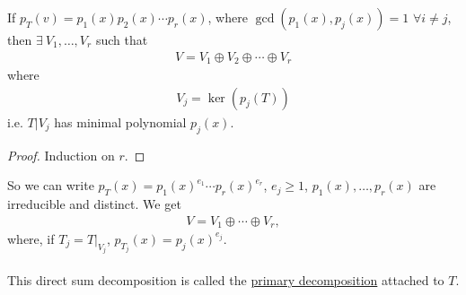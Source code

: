 \documentclass[class=scrartcl, crop=false]{standalone}
\begin{document}
\begin{theorem}
  If $p_T(v) = p_1(x)p_2(x)\cdots p_r(x)$, where $\gcd(p_1(x), p_j(x)) = 1$ $\forall i \neq j$, then $\exists \ V_1, \dots, V_r$ such that 
  \begin{gather*}
    V = V_1 \oplus V_2 \oplus \cdots \oplus V_r
  \end{gather*}  where
  \begin{gather*}
    V_j = \ker(p_j(T))
  \end{gather*} 
  i.e. $T | V_j$ has minimal polynomial $p_j(x)$.
  \begin{proof}
    Induction on $r$.
  \end{proof} 
\end{theorem} 
So we can write $p_T(x) = p_1(x)^{e_1} \cdots p_r(x)^{e_r}$, $e_j \geq 1$, $p_1(x), \dots, p_r(x)$ are irreducible and distinct. We get
\begin{gather*}
  V = V_1 \oplus \cdots \oplus V_r,
\end{gather*}
where, if $T_j = T|_{V_j}$, $p_{T_j}(x) = p_j(x)^{e_j}$.
\\\\
This direct sum decomposition is called the \ul{primary decomposition} attached to $T$. 
\end{document}
